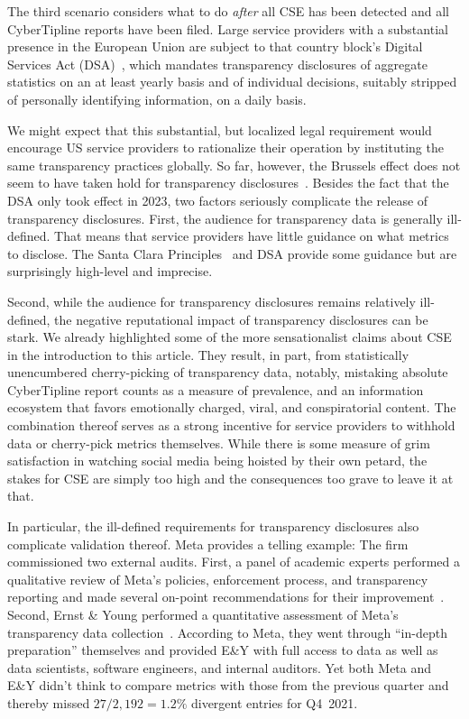\documentclass[anonymous,nonacm,screen,12pt]{acmart}
\newcommand\V[1]{{#1}}
\newcommand\V[1]{\textsc{\MakeLowercase{#1}}}
\theoremstyle{definition}
\begin{document}
The third scenario considers what to do \emph{after} all \V{CSE} has been
detected and all CyberTipline reports have been filed. Large service providers
with a substantial presence in the European Union are subject to that country
block's Digital Services Act (\V{DSA})~\cite{EuropeanParliamentAndCouncil2022},
which mandates transparency disclosures of aggregate statistics on an at least
yearly basis and of individual decisions, suitably stripped of personally
identifying information, on a daily basis.

We might expect that this substantial, but localized legal requirement would
encourage \V{US} service providers to rationalize their operation by instituting
the same transparency practices globally. So far, however, the Brussels effect
does not seem to have taken hold for transparency
disclosures~\cite{Bradford2020}. Besides the fact that the \V{DSA} only took
effect in 2023, two factors seriously complicate the release of transparency
disclosures. First, the audience for transparency data is generally ill-defined.
That means that service providers have little guidance on what metrics to
disclose. The Santa Clara
Principles~\cite{AccessNowACLUFoundationOfNorthernCaliforniaea2021} and \V{DSA}
provide some guidance but are surprisingly high-level and imprecise.

Second, while the audience for transparency disclosures remains relatively
ill-defined, the negative reputational impact of transparency disclosures can be
stark. We already highlighted some of the more sensationalist claims about
\V{CSE} in the introduction to this article. They result, in part, from
statistically unencumbered cherry-picking of transparency data, notably,
mistaking absolute CyberTipline report counts as a measure of prevalence, and an
information ecosystem that favors emotionally charged, viral, and conspiratorial
content. The combination thereof serves as a strong incentive for service
providers to withhold data or cherry-pick metrics themselves. While there is
some measure of grim satisfaction in watching social media being hoisted by
their own petard, the stakes for \V{CSE} are simply too high and the
consequences too grave to leave it at that.

In particular, the ill-defined requirements for transparency disclosures also
complicate validation thereof. Meta provides a telling example: The firm
commissioned two external audits. First, a panel of academic experts performed a
qualitative review of Meta's policies, enforcement process, and transparency
reporting and made several on-point recommendations for their
improvement~\cite{BradfordGriselea2019}. Second, Ernst \& Young performed a
quantitative assessment of Meta's transparency data collection~\cite{Meta2022}.
According to Meta, they went through ``in-depth preparation'' themselves and
provided \V{E\&Y} with full access to data as well as data scientists, software
engineers, and internal auditors. Yet both Meta and \V{E\&Y} didn't think to
compare metrics with those from the previous quarter and thereby missed
$27/2,192=1.2\%$ divergent entries for \V{Q4}~2021.
\end{document}
